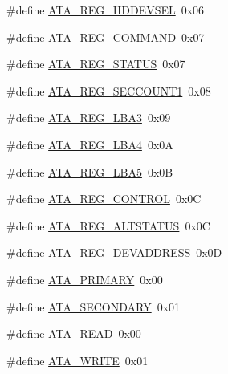 \begin{DoxyCompactItemize}
\item 
\#define \hyperlink{a00005_af80b9f0d852148eda227b433f72ca8bb_af80b9f0d852148eda227b433f72ca8bb}{A\+T\+A\+\_\+\+R\+E\+G\+\_\+\+H\+D\+D\+E\+V\+S\+EL}~0x06
\item 
\#define \hyperlink{a00005_a1a54069e05845badff84e1490ca4681e_a1a54069e05845badff84e1490ca4681e}{A\+T\+A\+\_\+\+R\+E\+G\+\_\+\+C\+O\+M\+M\+A\+ND}~0x07
\item 
\#define \hyperlink{a00005_a3b532ef33b38be16a240f8f2e21bc5db_a3b532ef33b38be16a240f8f2e21bc5db}{A\+T\+A\+\_\+\+R\+E\+G\+\_\+\+S\+T\+A\+T\+US}~0x07
\item 
\#define \hyperlink{a00005_a8a9a19e403cdc08cdb52ac4a77d44b1d_a8a9a19e403cdc08cdb52ac4a77d44b1d}{A\+T\+A\+\_\+\+R\+E\+G\+\_\+\+S\+E\+C\+C\+O\+U\+N\+T1}~0x08
\item 
\#define \hyperlink{a00005_af95cf3177ed01e63c3e2783f71e3bfb8_af95cf3177ed01e63c3e2783f71e3bfb8}{A\+T\+A\+\_\+\+R\+E\+G\+\_\+\+L\+B\+A3}~0x09
\item 
\#define \hyperlink{a00005_a39c9e21fd98a8933142af12c472ffb80_a39c9e21fd98a8933142af12c472ffb80}{A\+T\+A\+\_\+\+R\+E\+G\+\_\+\+L\+B\+A4}~0x0A
\item 
\#define \hyperlink{a00005_a24546e89863608bb2850a6ab39a24693_a24546e89863608bb2850a6ab39a24693}{A\+T\+A\+\_\+\+R\+E\+G\+\_\+\+L\+B\+A5}~0x0B
\item 
\#define \hyperlink{a00005_acd25672516342decdb4acb14b13dfa03_acd25672516342decdb4acb14b13dfa03}{A\+T\+A\+\_\+\+R\+E\+G\+\_\+\+C\+O\+N\+T\+R\+OL}~0x0C
\item 
\#define \hyperlink{a00005_a051769d4520d201d24bbb06758a5c1de_a051769d4520d201d24bbb06758a5c1de}{A\+T\+A\+\_\+\+R\+E\+G\+\_\+\+A\+L\+T\+S\+T\+A\+T\+US}~0x0C
\item 
\#define \hyperlink{a00005_adf8b096ca00ce8ce58af3dd79240b2e5_adf8b096ca00ce8ce58af3dd79240b2e5}{A\+T\+A\+\_\+\+R\+E\+G\+\_\+\+D\+E\+V\+A\+D\+D\+R\+E\+SS}~0x0D
\item 
\#define \hyperlink{a00005_aa18f254fa4afcfdb5fcf897eeaf38564_aa18f254fa4afcfdb5fcf897eeaf38564}{A\+T\+A\+\_\+\+P\+R\+I\+M\+A\+RY}~0x00
\item 
\#define \hyperlink{a00005_ad514d776b09e8b873aa7087ef0091fe6_ad514d776b09e8b873aa7087ef0091fe6}{A\+T\+A\+\_\+\+S\+E\+C\+O\+N\+D\+A\+RY}~0x01
\item 
\#define \hyperlink{a00005_a061cf4fd71859d6355aea5be3bae767a_a061cf4fd71859d6355aea5be3bae767a}{A\+T\+A\+\_\+\+R\+E\+AD}~0x00
\item 
\#define \hyperlink{a00005_a9a19b84aa7a02ac7e07528795816ffb2_a9a19b84aa7a02ac7e07528795816ffb2}{A\+T\+A\+\_\+\+W\+R\+I\+TE}~0x01
\end{DoxyCompactItemize}
